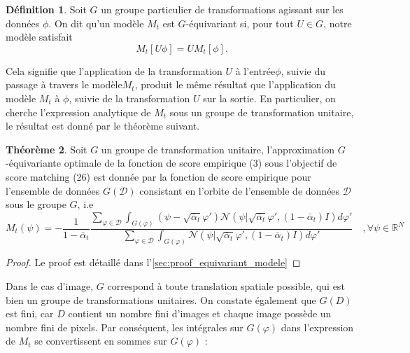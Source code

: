 \documentclass[a4paper,10pt]{article}
\theoremstyle{definition} %
\newtheorem{definition}{Définition}[section]
\theoremstyle{definition} %
\theoremstyle{definition} %
\newtheorem{theorem}[definition]{Théorème}
\theoremstyle{definition} %
\newcommand{\R}{\mathbb{R}}
\begin{document}
\begin{definition}
Soit \( G \) un groupe particulier de transformations agissant sur les données \( \phi \). On dit qu'un modèle \( M_t \) est \( G \)-équivariant si, pour tout \( U \in G \), notre modèle satisfait
\vspace{-5pt}
\begin{equation*}
    M_t[U\phi] = UM_t[\phi].
\end{equation*}
\end{definition}

Cela signifie que l'application de la transformation $U$ à l'entrée$\phi$, suivie du passage à travers le modèle$M_t$, produit le même résultat que l'application du modèle $M_t$ à $\phi$, suivie de la transformation $U$ sur la sortie. En particulier, on cherche l'expression analytique de $M_t$ sous un groupe de transformation unitaire, le résultat est donné par le théorème suivant.


\begin{theorem}\label{theo:equivariant_modele}
Soit $G$ un groupe de transformation unitaire, l'approximation \( G \)-équivariante optimale de la fonction de score empirique (3) sous l'objectif de score matching (26) est donnée par la fonction de score empirique pour l'ensemble de données \( G(\mathcal{D}) \) consistant en l'orbite de l'ensemble de données \( \mathcal{D} \) sous le groupe \( G \), i.e 
\begin{equation}\label{eq:model_sous_equivariant_contraint}
    M_t(\psi) = -\frac{1}{1-\bar \alpha_t} \frac{\sum_{\varphi \in \mathcal{D}} \int_{G(\varphi)} (\psi - \sqrt{\bar \alpha_t} \varphi') \mathcal{N}(\psi | \sqrt{\bar \alpha_t} \varphi', (1-\bar \alpha_t) I) d\varphi'}{\sum_{\varphi \in \mathcal{D}} \int_{G(\varphi)} \mathcal{N}(\psi | \sqrt{\bar \alpha_t} \varphi', (1-\bar \alpha_t) I) d\varphi'} \quad ,\forall\psi \in \R^N
\end{equation}
\end{theorem}

\begin{proof}
    Le proof est détaillé dans l'\cref{sec:proof_equivariant_modele}
\end{proof}

Dans le cas d'image, $G$ correspond à toute translation spatiale possible, qui est bien un groupe de transformations unitaires. On constate également que $G(D)$ est fini, car $D$ contient un nombre fini d'images et chaque image possède un nombre fini de pixels. Par conséquent, les intégrales sur $G(\varphi)$ dans l'expression de $M_t$ se convertissent en sommes sur $G(\varphi)$ :
\end{document}

